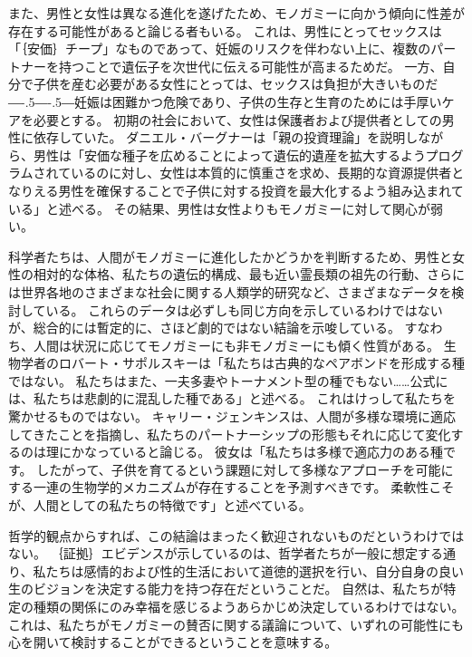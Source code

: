 \documentclass[paper=a4,book,openany]{jlreq}
\def\DDASH{―\kern-.5\zw―\kern-.5\zw―} %
\begin{document}
また、男性と女性は異なる進化を遂げたため、モノガミーに向かう傾向に性差が存在する可能性があると論じる者もいる。
これは、男性にとってセックスは「｛安価｝{チープ}」なものであって、妊娠のリスクを伴わない上に、複数のパートナーを持つことで遺伝子を次世代に伝える可能性が高まるためだ。
一方、自分で子供を産む必要がある女性にとっては、セックスは負担が大きいものだ{\DDASH}妊娠は困難かつ危険であり、子供の生存と生育のためには手厚いケアを必要とする。
初期の社会において、女性は保護者および提供者としての男性に依存していた。
ダニエル・バーグナーは「親の投資理論」を説明しながら、男性は「安価な種子を広めることによって遺伝的遺産を拡大するようプログラムされているのに対し、女性は本質的に慎重さを求め、長期的な資源提供者となりえる男性を確保することで子供に対する投資を最大化するよう組み込まれている」と述べる\citep{bergner13:_unexc}。
その結果、男性は女性よりもモノガミーに対して関心が弱い。

科学者たちは、人間がモノガミーに進化したかどうかを判断するため、男性と女性の相対的な体格、私たちの遺伝的構成、最も近い霊長類の祖先の行動、さらには世界各地のさまざまな社会に関する人類学的研究など、さまざまなデータを検討している。
これらのデータは必ずしも同じ方向を示しているわけではないが、総合的には暫定的に、さほど劇的ではない結論を示唆している。
すなわち、人間は状況に応じてモノガミーにも非モノガミーにも傾く性質がある。
生物学者のロバート・サポルスキーは「私たちは古典的なペアボンドを形成する種ではない。
私たちはまた、一夫多妻やトーナメント型の種でもない……公式には、私たちは悲劇的に混乱した種である」と述べる\citep{sapolsky25:_biolog_human_behav}。
これはけっして私たちを驚かせるものではない。
キャリー・ジェンキンスは、人間が多様な環境に適応してきたことを指摘し、私たちのパートナーシップの形態もそれに応じて変化するのは理にかなっていると論じる。
彼女は「私たちは多様で適応力のある種です。
したがって、子供を育てるという課題に対して多様なアプローチを可能にする一連の生物学的メカニズムが存在することを予測すべきです。
柔軟性こそが、人間としての私たちの特徴です」と述べている\citep{dominus17:_is_open_marriag_happier_marriag}。

哲学的観点からすれば、この結論はまったく歓迎されないものだというわけではない。
｛証拠｝{エビデンス}が示しているのは、哲学者たちが一般に想定する通り、私たちは感情的および性的生活において道徳的選択を行い、自分自身の良い生のビジョンを決定する能力を持つ存在だということだ。
自然は、私たちが特定の種類の関係にのみ幸福を感じるようあらかじめ決定しているわけではない。
これは、私たちがモノガミーの賛否に関する議論について、いずれの可能性にも心を開いて検討することができるということを意味する。
\end{document}
